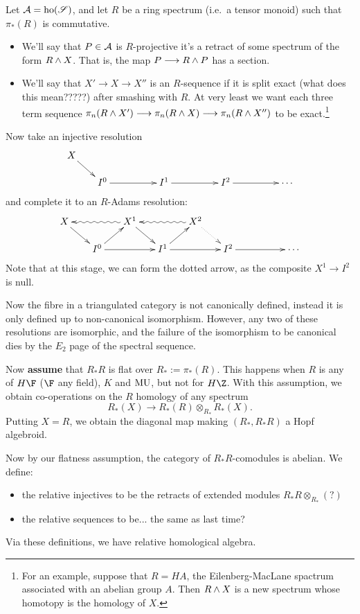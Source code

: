 \documentclass[11pt]{article}
\begin{document}
\begin{don't show}
Let $\mathcal{A}=\textup{ho}(\mathscr{S})$, and let $R$ be a ring spectrum (i.e.\ a tensor monoid) such that $\pi_{*}(R)$ is commutative. 
\begin{itemize}\squishlist
\item We'll say that $P\in\mathcal{A}$ is $R$-projective \Iff it's a retract of some spectrum of the form $R\wedge X$. That is, \Iff the map $P\longrightarrow R\wedge P$ has a section.
\item We'll say that $X'\to X\to X''$ is an $R$-sequence if it is split exact (what does this mean?????) after smashing with $R$. At very least we want each three term sequence $\pi_{n}(R\wedge X')\longrightarrow\pi_{n}(R\wedge X)\longrightarrow\pi_{n}(R\wedge X'')$ to be exact.\footnote{For an example, suppose that $R=HA$, the Eilenberg-MacLane spactrum associated with an abelian group $A$. Then $R\wedge X$ is a new spectrum whose homotopy is the homology of $X$.}
\end{itemize}
Now take an injective resolution
\[\xymatrix@R=.5cm@C=.5cm@!C{
X\ar[dr]&%
&%
&%
&%
&%
&%
&%
\\%
&%
I^0\ar[rr]&%
&%
I^1\ar[rr]&%
&%
I^2\ar[rr]&%
&%
\cdots%
}\]
and complete it to an $R$-Adams resolution:
\[\xymatrix@R=.5cm@C=.5cm@!C{
X\ar[dr]&%
&%
X^1\ar@{~>}[ll]\ar[dr]&%
&%
X^2\ar@{~>}[ll]\ar@{..>}[dr]&%
&%
&%
\\%
&%
\ar[ur]I^0\ar[rr]&%
&%
\ar[ur]I^1\ar[rr]&%
&%
I^2\ar[rr]&%
&%
\cdots%
}\]
Note that at this stage, we can form the dotted arrow, as the composite $X^1\to I^2$ is null.

Now the fibre in a triangulated category is not canonically defined, instead it is only defined up to non-canonical isomorphism. However, any two of these resolutions are isomorphic, and the failure of the isomorphism to be canonical dies by the $E_2$ page of the spectral sequence.


Now \textbf{assume} that $R_*R$ is flat over $R_*:=\pi_{*}(R)$. This happens when $R$ is any of $H\F$ ($\F$ any field), $K$ and $\textup{MU}$, but not for $H\Z$. With this assumption, we obtain co-operations on the $R$ homology of any spectrum
\[R_*(X)\to R_*(R)\otimes_{R_*}R_*(X).\]
Putting $X=R$, we obtain the diagonal map making $(R_*,R_*R)$ a Hopf algebroid.

Now by our flatness assumption, the category of $R_*R$-comodules is abelian. We define:
\begin{itemize}\squishlist
\item the relative injectives to be the retracts of extended modules $R_*R\otimes_{R_*}(?)$
\item the relative sequences to be... the same as last time?
\end{itemize}
Via these definitions, we have relative homological algebra.


\end{don't show}
\end{document}
